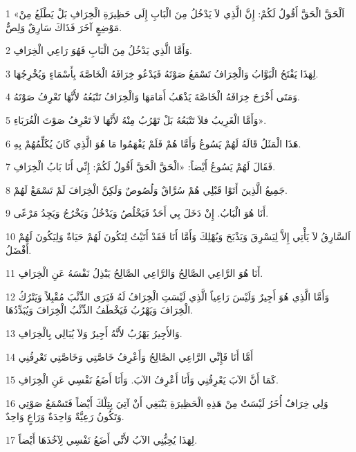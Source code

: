 \par 1 «اَلْحَقَّ الْحَقَّ أَقُولُ لَكُمْ: إِنَّ الَّذِي لاَ يَدْخُلُ مِنَ الْبَابِ إِلَى حَظِيرَةِ الْخِرَافِ بَلْ يَطْلَعُ مِنْ مَوْضِعٍ آخَرَ فَذَاكَ سَارِقٌ وَلِصٌّ.
\par 2 وَأَمَّا الَّذِي يَدْخُلُ مِنَ الْبَابِ فَهُوَ رَاعِي الْخِرَافِ.
\par 3 لِهَذَا يَفْتَحُ الْبَوَّابُ وَالْخِرَافُ تَسْمَعُ صَوْتَهُ فَيَدْعُو خِرَافَهُ الْخَاصَّةَ بِأَسْمَاءٍ وَيُخْرِجُهَا.
\par 4 وَمَتَى أَخْرَجَ خِرَافَهُ الْخَاصَّةَ يَذْهَبُ أَمَامَهَا وَالْخِرَافُ تَتْبَعُهُ لأَنَّهَا تَعْرِفُ صَوْتَهُ.
\par 5 وَأَمَّا الْغَرِيبُ فلاَ تَتْبَعُهُ بَلْ تَهْرُبُ مِنْهُ لأَنَّهَا لاَ تَعْرِفُ صَوْتَ الْغُرَبَاءِ».
\par 6 هَذَا الْمَثَلُ قَالَهُ لَهُمْ يَسُوعُ وَأَمَّا هُمْ فَلَمْ يَفْهَمُوا مَا هُوَ الَّذِي كَانَ يُكَلِّمُهُمْ بِهِ.
\par 7 فَقَالَ لَهُمْ يَسُوعُ أَيْضاً: «الْحَقَّ الْحَقَّ أَقُولُ لَكُمْ: إِنِّي أَنَا بَابُ الْخِرَافِ.
\par 8 جَمِيعُ الَّذِينَ أَتَوْا قَبْلِي هُمْ سُرَّاقٌ وَلُصُوصٌ وَلَكِنَّ الْخِرَافَ لَمْ تَسْمَعْ لَهُمْ.
\par 9 أَنَا هُوَ الْبَابُ. إِنْ دَخَلَ بِي أَحَدٌ فَيَخْلُصُ وَيَدْخُلُ وَيَخْرُجُ وَيَجِدُ مَرْعًى.
\par 10 اَلسَّارِقُ لاَ يَأْتِي إِلاَّ لِيَسْرِقَ وَيَذْبَحَ وَيُهْلِكَ وَأَمَّا أَنَا فَقَدْ أَتَيْتُ لِتَكُونَ لَهُمْ حَيَاةٌ وَلِيَكُونَ لَهُمْ أَفْضَلُ.
\par 11 أَنَا هُوَ الرَّاعِي الصَّالِحُ وَالرَّاعِي الصَّالِحُ يَبْذِلُ نَفْسَهُ عَنِ الْخِرَافِ.
\par 12 وَأَمَّا الَّذِي هُوَ أَجِيرٌ وَلَيْسَ رَاعِياً الَّذِي لَيْسَتِ الْخِرَافُ لَهُ فَيَرَى الذِّئْبَ مُقْبِلاً وَيَتْرُكُ الْخِرَافَ وَيَهْرُبُ فَيَخْطَفُ الذِّئْبُ الْخِرَافَ وَيُبَدِّدُهَا.
\par 13 وَالأَجِيرُ يَهْرُبُ لأَنَّهُ أَجِيرٌ وَلاَ يُبَالِي بِالْخِرَافِ.
\par 14 أَمَّا أَنَا فَإِنِّي الرَّاعِي الصَّالِحُ وَأَعْرِفُ خَاصَّتِي وَخَاصَّتِي تَعْرِفُنِي
\par 15 كَمَا أَنَّ الآبَ يَعْرِفُنِي وَأَنَا أَعْرِفُ الآبَ. وَأَنَا أَضَعُ نَفْسِي عَنِ الْخِرَافِ.
\par 16 وَلِي خِرَافٌ أُخَرُ لَيْسَتْ مِنْ هَذِهِ الْحَظِيرَةِ يَنْبَغِي أَنْ آتِيَ بِتِلْكَ أَيْضاً فَتَسْمَعُ صَوْتِي وَتَكُونُ رَعِيَّةٌ وَاحِدَةٌ وَرَاعٍ وَاحِدٌ.
\par 17 لِهَذَا يُحِبُّنِي الآبُ لأَنِّي أَضَعُ نَفْسِي لِآخُذَهَا أَيْضاً.
